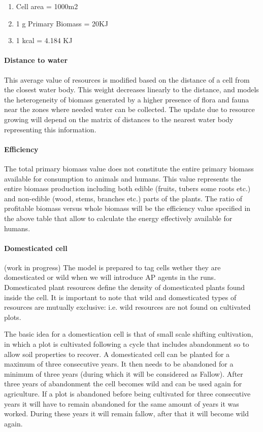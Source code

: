 \documentclass[11pt,oneside,a4paper,openright]{report}
\begin{document}
\begin{enumerate}
 \item Cell area = 1000m2
 \item 1 g Primary Biomass = 20KJ
 \item 1 kcal = 4.184 KJ
\end{enumerate}



\paragraph{Distance to water}
This average value of resources is modified based on the distance of a cell from the closest
water body. This weight decreases linearly to the distance, and models the heterogeneity of
biomass generated by a higher presence of flora and fauna near the zones where needed
water can be collected. The update due to resource growing will depend on the matrix of distances
to the nearest water body representing this information.

\paragraph{Efficiency}
The total primary biomass value does not constitute the entire primary biomass available for
consumption to animals and humans. This value represents the entire biomass production
including both edible (fruits, tubers some roots etc.) and non-edible (wood, stems, branches
etc.) parts of the plants. The ratio of profitable biomass versus whole biomass will be the
efficiency value specified in the above table that allow to calculate the energy effectively
available for humans.

\paragraph{Domesticated cell} (work in progress)
The model is prepared to tag cells wether they are domesticated or wild when we will introduce AP 
agents in the runs. Domesticated plant resources define the density of domesticated plants found inside the cell. It is important to note that wild and domesticated types of resources 
are mutually exclusive: i.e. wild resources are not found on cultivated plots. 

The basic idea for a domestication cell is that of small scale shifting cultivation, in which a plot is
cultivated following a cycle that includes abandonment so to allow soil properties to recover. A
domesticated cell can be planted for a maximum of three consecutive years. It then needs to be
abandoned for a minimum of three years (during which it will be considered as Fallow). After three
years of abandonment the cell becomes wild and can be used again for agriculture. If a plot is
abandoned before being cultivated for three consecutive years it will have to remain abandoned for
the same amount of years it was worked. During these years it will remain fallow, after that it will
become wild again.
\end{document}
